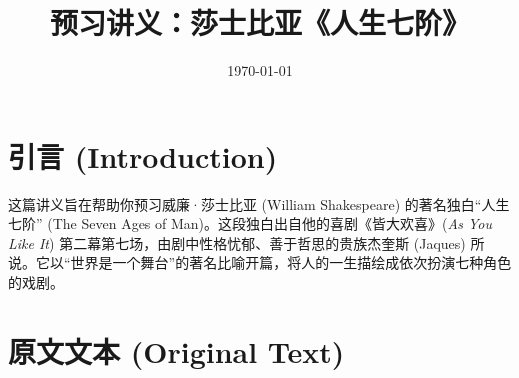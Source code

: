 \documentclass[12pt, a4paper]{article}
\title{\textbf{预习讲义：莎士比亚《人生七阶》}}
\date{\today}
\begin{document}
\maketitle

\section{引言 (Introduction)}

这篇讲义旨在帮助你预习威廉·莎士比亚 (William Shakespeare) 的著名独白“人生七阶” (The Seven Ages of Man)。这段独白出自他的喜剧《皆大欢喜》(\textit{As You Like It}) 第二幕第七场，由剧中性格忧郁、善于哲思的贵族杰奎斯 (Jaques) 所说。它以“世界是一个舞台”的著名比喻开篇，将人的一生描绘成依次扮演七种角色的戏剧。

\section{原文文本 (Original Text)}
\end{document}
